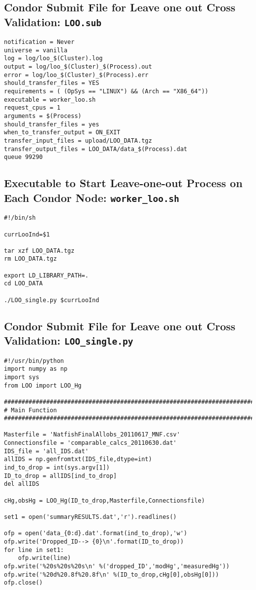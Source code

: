 \documentclass[11pt,twoside,onecolumn]{usgsreport}
\begin{document}
\subsection{Condor Submit File for Leave one out Cross Validation: \texttt{LOO.sub}}
\begin{lstlisting}
notification = Never
universe = vanilla
log = log/loo_$(Cluster).log
output = log/loo_$(Cluster)_$(Process).out
error = log/loo_$(Cluster)_$(Process).err
should_transfer_files = YES
requirements = ( (OpSys == "LINUX") && (Arch == "X86_64"))
executable = worker_loo.sh
request_cpus = 1
arguments = $(Process)
should_transfer_files = yes
when_to_transfer_output = ON_EXIT
transfer_input_files = upload/LOO_DATA.tgz
transfer_output_files = LOO_DATA/data_$(Process).dat
queue 99290 
\end{lstlisting}

\subsection{Executable to Start Leave-one-out Process on Each Condor Node: \texttt{worker\_loo.sh}}
\begin{lstlisting}
#!/bin/sh

currLooInd=$1

tar xzf LOO_DATA.tgz
rm LOO_DATA.tgz

export LD_LIBRARY_PATH=.
cd LOO_DATA

./LOO_single.py $currLooInd
\end{lstlisting}

\subsection{Condor Submit File for Leave one out Cross Validation: \texttt{LOO\_single.py}}

\begin{lstlisting}
#!/usr/bin/python
import numpy as np
import sys
from LOO import LOO_Hg

####################################################################################
# Main Function
####################################################################################

Masterfile = 'NatfishFinalAllobs_20110617_MNF.csv'
Connectionsfile = 'comparable_calcs_20110630.dat'
IDS_file = 'all_IDS.dat'
allIDS = np.genfromtxt(IDS_file,dtype=int)
ind_to_drop = int(sys.argv[1])
ID_to_drop = allIDS[ind_to_drop]
del allIDS

cHg,obsHg = LOO_Hg(ID_to_drop,Masterfile,Connectionsfile)

set1 = open('summaryRESULTS.dat','r').readlines()

ofp = open('data_{0:d}.dat'.format(ind_to_drop),'w')
ofp.write('Dropped_ID--> {0}\n'.format(ID_to_drop))
for line in set1:
    ofp.write(line)
ofp.write('%20s%20s%20s\n' %('dropped_ID','modHg','measuredHg'))
ofp.write('%20d%20.8f%20.8f\n' %(ID_to_drop,cHg[0],obsHg[0]))
ofp.close()
\end{lstlisting}
\end{document}
